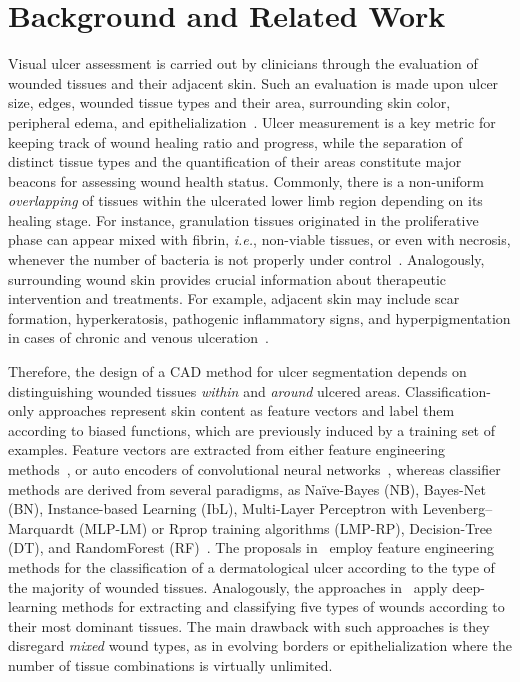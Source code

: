 \section{Background and Related Work}\label{sec:background}

Visual ulcer assessment is carried out by clinicians through the evaluation of wounded tissues and their adjacent skin.
Such an evaluation is made upon ulcer size, edges, wounded tissue types and their area, surrounding skin color, peripheral edema, and epithelialization~\cite{Todd2018}.
Ulcer measurement is a key metric for keeping track of wound healing ratio and progress, while the separation of distinct tissue types and the quantification of their areas constitute major beacons for assessing wound health status.
Commonly, there is a non-uniform \textit{overlapping} of tissues within the ulcerated lower limb region depending on its healing stage.
For instance, granulation tissues originated in the proliferative phase can appear mixed with fibrin, \textit{i.e.}, non-viable tissues, or even with necrosis, whenever the number of bacteria is not properly under control~\cite{Pereyra2014}.
Analogously, surrounding wound skin provides crucial information about therapeutic intervention and treatments.
For example, adjacent skin may include scar formation, hyperkeratosis, pathogenic inflammatory signs, and hyper\-pigmentation in cases of chronic and venous ulceration~\cite{Todd2018}.

Therefore, the design of a CAD method for ulcer segmentation depends on distinguishing wounded tissues \textit{within} and \textit{around} ulcered areas.
Classification-only approaches represent skin content as feature vectors and label them according to biased functions, which are previously induced by a training set of examples.
Feature vectors are extracted from either feature engineering methods~\cite{Sonka2014}, or auto encoders of convolutional neural networks~\cite{Aggarwal2018}, whereas classifier methods are derived from several paradigms, as Na\"{i}ve-Bayes (NB), Bayes-Net (BN), Instance-based Learning (IbL), Multi-Layer Perceptron with Levenberg--Marquardt (MLP-LM) or Rprop training algorithms (LMP-RP), Decision-Tree (DT), and RandomForest (RF)~\cite{Aggarwal2015}.
The proposals in~\cite{Kavitha2017,Blanco2016,Chino2018} employ feature engineering methods for the classification of a dermatological ulcer according to the type of the majority of wounded tissues.
Analogously, the approaches in~\cite{Deserno2018,Godeiro2018,Zahia2018} apply deep-learning methods for extracting and classifying five types of wounds according to their most dominant tissues.
The main drawback with such approaches is they disregard \textit{mixed} wound types, as in evolving borders or epithelialization where the number of tissue combinations is virtually unlimited.

